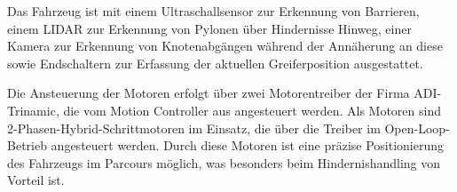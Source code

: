 \documentclass[main.tex]{subfiles} %
\begin{document}
Das Fahrzeug ist mit einem Ultraschallsensor zur Erkennung von Barrieren, einem
LIDAR zur Erkennung von Pylonen über Hindernisse Hinweg, einer Kamera zur
Erkennung von Knotenabgängen während der Annäherung an diese sowie Endschaltern
zur Erfassung der aktuellen Greiferposition ausgestattet.

Die Ansteuerung der Motoren erfolgt über zwei Motorentreiber der Firma
ADI-Trinamic, die vom Motion Controller aus angesteuert werden. Als Motoren
sind 2-Phasen-Hybrid-Schrittmotoren im Einsatz, die über die Treiber im
Open-Loop-Betrieb angesteuert werden. Durch diese Motoren ist eine präzise
Positionierung des Fahrzeugs im Parcours möglich, was besonders beim
Hindernishandling von Vorteil ist.
\end{document}
